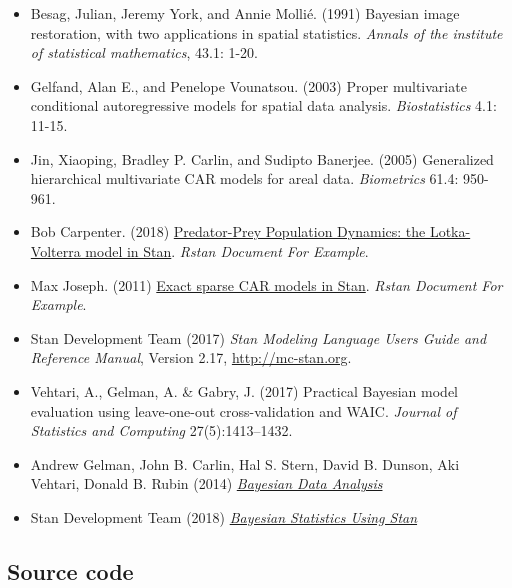 \documentclass[]{tufte-handout}
\providecommand{\tightlist}{%
  \setlength{\itemsep}{0pt}\setlength{\parskip}{0pt}}
\begin{document}
\begin{itemize}
\tightlist
\item
  Besag, Julian, Jeremy York, and Annie Mollié. (1991) Bayesian image
  restoration, with two applications in spatial statistics. \emph{Annals
  of the institute of statistical mathematics}, 43.1: 1-20.
\item
  Gelfand, Alan E., and Penelope Vounatsou. (2003) Proper multivariate
  conditional autoregressive models for spatial data analysis.
  \emph{Biostatistics} 4.1: 11-15.
\item
  Jin, Xiaoping, Bradley P. Carlin, and Sudipto Banerjee. (2005)
  Generalized hierarchical multivariate CAR models for areal data.
  \emph{Biometrics} 61.4: 950-961.
\item
  Bob Carpenter. (2018)
  \href{http://mc-stan.org/users/documentation/case-studies/lotka-volterra-predator-prey.html\#data-lynx-and-hare-pelts-in-canada}{Predator-Prey
  Population Dynamics: the Lotka-Volterra model in Stan}. \emph{Rstan
  Document For Example}.
\item
  Max Joseph. (2011)
  \href{http://mc-stan.org/users/documentation/case-studies/mbjoseph-CARStan.html}{Exact
  sparse CAR models in Stan}. \emph{Rstan Document For Example}.
\item
  Stan Development Team (2017) \emph{Stan Modeling Language Users Guide
  and Reference Manual}, Version 2.17, \url{http://mc-stan.org}.
\item
  Vehtari, A., Gelman, A. \& Gabry, J. (2017) Practical Bayesian model
  evaluation using leave-one-out cross-validation and WAIC.
  \emph{Journal of Statistics and Computing} 27(5):1413--1432.
\item
  Andrew Gelman, John B. Carlin, Hal S. Stern, David B. Dunson, Aki
  Vehtari, Donald B. Rubin (2014)
  \href{https://www.google.com/search?q=bayesian+data+analysis\&oq=bayesian+data+analysis\&aqs=chrome.0.69i59j69i60l2j69i61j69i65j0.3253j1j4\&sourceid=chrome\&ie=UTF-8}{\emph{Bayesian
  Data Analysis}}
\item
  Stan Development Team (2018)
  \href{http://www.stat.columbia.edu/~gelman/bda.course/_book/}{\emph{Bayesian
  Statistics Using Stan}}
\end{itemize}

\hypertarget{source-code}{%
\subsection*{Source code}\label{source-code}}
\end{document}
